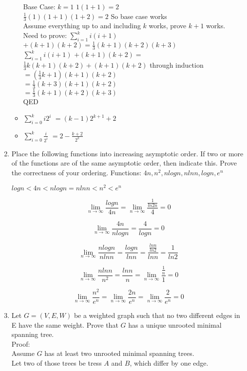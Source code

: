 \documentclass[12pt]{article}
\begin{document}
\begin{enumerate}
\begin{itemize}
Base Case: $k=1$
$1(1+1) = 2$\\
$\frac{1}{3}(1)(1+1)(1+2) = 2$ So base case works\\

Assume everything up to and including $k$ works, prove $k+1$ works.\\
Need to prove: $\displaystyle\sum\limits_{i=1}^k i(i+1)$ $+(k+1)(k+2) =
\frac{1}{3}(k+1)(k+2)(k+3)$\\
$\displaystyle\sum\limits_{i=1}^k i(i+1)$ $+(k+1)(k+2) =$\\
$\frac{1}{3}k(k+1)(k+2)+(k+1)(k+2)$ through induction\\
$= (\frac{1}{3}k+1)(k+1)(k+2)$\\
$= \frac{1}{3}(k+3)(k+1)(k+2)$\\
$= \frac{1}{3}(k+1)(k+2)(k+3)$\\
QED
\item $\displaystyle\sum\limits_{i=0}^k i2^i $ $= (k-1)2^{k+1}+2$
\item $\displaystyle\sum\limits_{i=0}^k \frac{i}{2^i} $ $= 2-\frac{k+2}{2^k}$
\end{itemize}


\item Place the following functions into increasing asymptotic order. If two
or more of the functions are of the same asymptotic order, then indicate this.
Prove the correctness of your ordering.
Functions: $4n, n^2, nlogn, nlnn, logn, e^n$

$logn < 4n < nlogn = nlnn < n^2 < e^n$


$$\lim_{n\to\infty} \frac{logn}{4n} = \lim_{n\to\infty} \frac{\frac{1}{ln2n}}{4} = 0$$

$$\lim_{n\to\infty} \frac{4n}{nlogn} = \frac{4}{logn} = 0$$

$$\lim_{n\to\infty} \frac{nlogn}{nlnn} = \frac{logn}{lnn} =
\frac{\frac{lnn}{ln2}}{lnn} = \frac{1}{ln2}$$

$$\lim_{n\to\infty} \frac{nlnn}{n^2} = \frac{lnn}{n} = \lim_{n\to\infty}
\frac{\frac{1}{n}}{1} = 0$$

$$\lim_{n\to\infty} \frac{n^2}{e^n} = \lim_{n\to\infty} \frac{2n}{e^n} = 
\lim_{n\to\infty} \frac{2}{e^n} = 0$$


\item Let $G = (V,E,W)$ be a weighted graph such that no two different edges
in E have the same weight. Prove that $G$ has a unique unrooted minimal spanning
tree.\\
Proof:\\
Assume $G$ has at least two unrooted minimal spanning trees.\\
Let two of those trees be tress $A$ and $B$, which differ by one
edge.


\end{enumerate}
\end{document}
